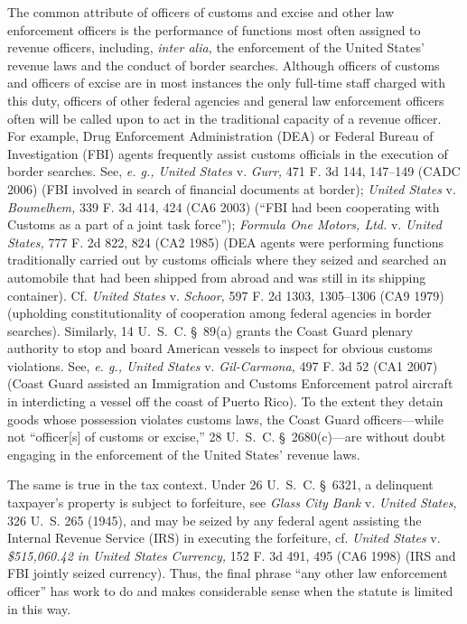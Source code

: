   The common attribute of officers of customs and excise and other law enforcement officers is the performance of functions most often assigned to revenue officers, including, \emph{inter alia,} the enforcement of the United States' revenue laws and the conduct of border searches. Although officers of customs and officers of excise are in most instances the only full-time staff charged with this duty, officers of other federal agencies and general law enforcement officers often will be called upon to act in the traditional capacity of a revenue officer. For example, Drug Enforcement Administration (DEA) or Federal Bureau of Investigation (FBI) agents frequently assist customs officials in the execution of border searches. See, \emph{e. g., United States} v. \emph{Gurr,} 471 F. 3d 144, 147--149 (CADC 2006) (FBI involved in search of financial documents at border); \emph{United States} v. \emph{Boumelhem,} 339 F. 3d 414, 424 (CA6 2003) (``FBI had been cooperating with Customs as a part of a joint task force''); \emph{Formula One Motors, Ltd.} v. \emph{United States,} 777 F. 2d 822, 824 (CA2 1985) (DEA \newpage agents were performing functions traditionally carried out by customs officials where they seized and searched an automobile that had been shipped from abroad and was still in its shipping container). Cf. \emph{United States} v. \emph{Schoor,} 597 F. 2d 1303, 1305--1306 (CA9 1979) (upholding constitutionality of cooperation among federal agencies in border searches). Similarly, 14 U.~S.~C. \S~89(a) grants the Coast Guard plenary authority to stop and board American vessels to inspect for obvious customs violations. See, \emph{e. g., United States} v. \emph{Gil-Carmona,} 497 F. 3d 52 (CA1 2007) (Coast Guard assisted an Immigration and Customs Enforcement patrol aircraft in interdicting a vessel off the coast of Puerto Rico). To the extent they detain goods whose possession violates customs laws, the Coast Guard officers---while not ``officer[s] of customs or excise,'' 28 U.~S.~C. \S~2680(c)---are without doubt engaging in the enforcement of the United States' revenue laws.

  The same is true in the tax context. Under 26 U.~S.~C. \S~6321, a delinquent taxpayer's property is subject to forfeiture, see \emph{Glass City Bank} v. \emph{United States,} 326 U.~S. 265 (1945), and may be seized by any federal agent assisting the Internal Revenue Service (IRS) in executing the forfeiture, cf. \emph{United States} v. \emph{\$515,060.42 in United States Currency,} 152 F. 3d 491, 495 (CA6 1998) (IRS and FBI jointly seized currency). Thus, the final phrase ``any other law enforcement officer'' has work to do and makes considerable sense when the statute is limited in this way.


